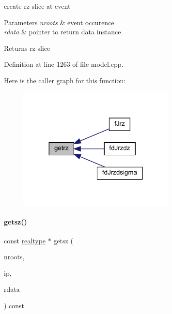 create rz slice at event 
\begin{DoxyParams}{Parameters}
{\em nroots} & event occurence \\
\hline
{\em rdata} & pointer to return data instance \\
\hline
\end{DoxyParams}
\begin{DoxyReturn}{Returns}
rz slice 
\end{DoxyReturn}


Definition at line 1263 of file model.\+cpp.

Here is the caller graph for this function\+:
\nopagebreak
\begin{figure}[H]
\begin{center}
\leavevmode
\includegraphics[width=224pt]{classamici_1_1_model_ab2a9be3bb641741a52ddc48fcd9aa143_icgraph}
\end{center}
\end{figure}
\mbox{\label{classamici_1_1_model_a78863f621eda7016ab7136a357dacdaf}} 
\paragraph{\texorpdfstring{getsz()}{getsz()}}
{\footnotesize\ttfamily const \mbox{\hyperlink{namespaceamici_a1bdce28051d6a53868f7ccbf5f2c14a3}{realtype}} $\ast$ getsz (\begin{DoxyParamCaption}\item[{const int}]{nroots,  }\item[{const int}]{ip,  }\item[{const \mbox{\hyperlink{classamici_1_1_return_data}{Return\+Data}} $\ast$}]{rdata }\end{DoxyParamCaption}) const\hspace{0.3cm}{\ttfamily [protected]}}

